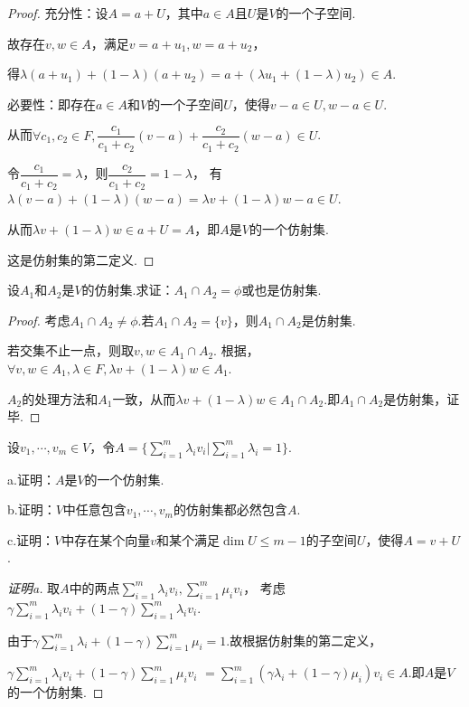 \begin{proof}
    充分性：设\(A=a+U\)，其中\(a\in A\)且\(U\)是\(V\)的一个子空间.

    故存在\(v,w \in A\)，满足\(v=a+u_1,w=a+u_2\)，

    得\(\lambda(a+u_1)+(1-\lambda)(a+u_2)=a+(\lambda u_1+(1-\lambda)u_2) \in A\).

    必要性：即存在\(a \in A\)和\(V\)的一个子空间\(U\)，使得\(v-a \in U,w-a \in U\).

    从而\(\forall c_1,c_2 \in F,\dfrac{c_1}{c_1+c_2}(v-a)+\dfrac{c_2}{c_1+c_2}(w-a) \in U\).

    令\(\dfrac{c_1}{c_1+c_2}=\lambda\)，则\(\dfrac{c_2}{c_1+c_2}=1-\lambda\)，
    有\(\lambda (v-a)+(1- \lambda)(w-a)=\lambda v+(1- \lambda)w-a \in U\).

    从而\(\lambda v+(1- \lambda)w \in a+U=A\)，即\(A\)是\(V\)的一个仿射集.

    {\kaishu 这是仿射集的第二定义.}
\end{proof}

\begin{problem}[9]\label{3.E.9}
    设\(A_1\)和\(A_2\)是\(V\)的仿射集.求证：\(A_1 \cap A_2=\phi\)或也是仿射集.
\end{problem}

\begin{proof}
    考虑\(A_1 \cap A_2 \ne \phi\).若\(A_1 \cap A_2=\{v\}\)，则\(A_1 \cap A_2\)是仿射集.

    若交集不止一点，则取\(v,w \in A_1 \cap A_2\).
    根据，\(\forall v,w \in A_1,\lambda \in F,\lambda v+(1-\lambda)w \in A_1\).

    \(A_2\)的处理方法和\(A_1\)一致，从而\(\lambda v+(1- \lambda)w \in A_1 \cap A_2\).即\(A_1 \cap A_2\)是仿射集，证毕.
\end{proof}

\newpage

\begin{problem}[11]\label{3.E.11}
    设\(v_1,\cdots,v_m \in V\)，令\(A=\{\sum_{i=1}^m \lambda_i v_i|\sum_{i=1}^m \lambda_i=1\}\).

    a.证明：\(A\)是\(V\)的一个仿射集.

    b.证明：\(V\)中任意包含\(v_1,\cdots,v_m\)的仿射集都必然包含\(A\).

    c.证明：\(V\)中存在某个向量\(v\)和某个满足\(\dim U \leq m-1\)的子空间\(U\)，使得\(A=v+U\).
\end{problem}

\begin{proof}[证明a]
    取\(A\)中的两点\(\sum_{i=1}^m \lambda_i v_i,\sum_{i=1}^m \mu_i v_i\)，
    考虑\(\gamma \sum_{i=1}^m \lambda_i v_i+(1-\gamma)\sum_{i=1}^m \lambda_i v_i\).
    
    由于\(\gamma \sum_{i=1}^m \lambda_i+(1-\gamma)\sum_{i=1}^m \mu_i=1\).故根据仿射集的第二定义，
    
    \(\gamma \sum_{i=1}^m \lambda_i v_i+(1-\gamma)\sum_{i=1}^m \mu_i v_i\)
    \(=\sum_{i=1}^m(\gamma \lambda_i+(1-\gamma)\mu_i)v_i \in A\).即\(A\)是\(V\)的一个仿射集.    
\end{proof}

